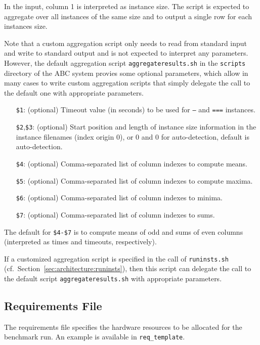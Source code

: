 \documentclass[a4paper]{article}
\newcommand{\abcs}{{ABC}}
\begin{document}
			In the input, column 1 is interpreted as instance size. The script is expected to aggregate
			over all instances of the same size and to output a single row for each instances size.
	
			Note that a custom aggregation script only needs to read from standard input and write to standard output
			and is not expected to interpret any parameters.
			However,
			the default aggregation script {\tt aggregateresults.sh} in the {\tt scripts} directory of the \abcs{} system
			provies some optional parameters, which allow in many cases to write custom aggregation scripts
			that simply delegate the call to the default one with appropriate parameters.
	
		    \medskip{}
		    \begin{itemize}
				\item[{\tt \$1}:] (optional) Timeout value (in seconds) to be used for {\tt ---} and {\tt ===} instances.
				\item[{\tt \$2},{\tt \$3}:] (optional) Start position and length of instance size information in the instance filenames (index origin $0$),
					or $0$ and $0$ for auto-detection, default is auto-detection.
				\item[{\tt \$4}:] (optional) Comma-separated list of column indexes to compute means.
				\item[{\tt \$5}:] (optional) Comma-separated list of column indexes to compute maxima.
				\item[{\tt \$6}:] (optional) Comma-separated list of column indexes to minima.
				\item[{\tt \$7}:] (optional) Comma-separated list of column indexes to sums.
		    \end{itemize}
	
			The default for {\tt \$4-\$7}
			is to compute means of odd and sums of even columns (interpreted as times and timeouts, respectively).
	
			If a customized aggregation script is specified in the call of {\tt runinsts.sh} (cf.~Section~\ref{sec:architecture:runinsts}),
			then this script can delegate the call to the default script {\tt aggregateresults.sh} with appropriate parameters.
	
		\subsection{Requirements File}
		\label{sec:architecture:reqfile}
				
			The requirements file specifies the hardware resources to be allocated
			for the benchmark run.
			An example is available in {\tt req\_template}.
			
\end{document}
